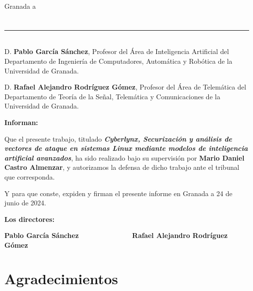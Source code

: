 \vspace{2cm}

\begin{flushright}
Granada a \DTMtoday
\end{flushright}


\chapter*{}
\thispagestyle{empty}

\noindent\rule[-1ex]{\textwidth}{2pt}\\[4.5ex]

D. \textbf{Pablo García Sánchez}, Profesor del Área de Inteligencia Artificial del Departamento de Ingeniería de Computadores, Automática y Robótica de la Universidad de Granada.

\vspace{0.5cm}

D. \textbf{Rafael Alejandro Rodríguez Gómez}, Profesor del Área de Telemática del Departamento de Teoría de la Señal, Telemática y Comunicaciones de la Universidad de Granada.


\vspace{0.5cm}

\textbf{Informan:}

\vspace{0.5cm}

Que el presente trabajo, titulado \textit{\textbf{Cyberlynx, Securización y análisis de vectores de ataque en sistemas Linux mediante modelos de inteligencia artificial avanzados}},
ha sido realizado bajo su supervisión por \textbf{Mario Daniel Castro Almenzar}, y autorizamos la defensa de dicho trabajo ante el tribunal
que corresponda.

\vspace{0.5cm}

Y para que conste, expiden y firman el presente informe en Granada a 24 de junio de 2024.

\vspace{1cm}

\textbf{Los directores:}

\vspace{5cm}

\noindent \textbf{Pablo García Sánchez \ \ \ \ \ \ \ \ \ \ \ \ \ Rafael Alejandro Rodríguez Gómez}

\chapter*{Agradecimientos}
\thispagestyle{empty}


